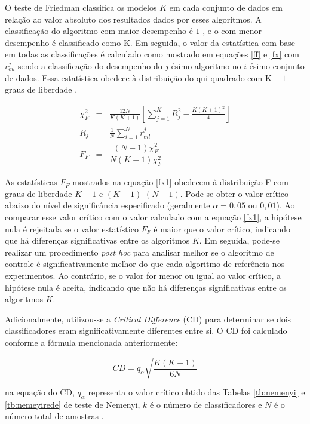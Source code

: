 O teste de Friedman classifica os modelos $K$ em cada conjunto de dados em relação ao valor absoluto dos resultados dados por esses algoritmos. A classificação do algoritmo com maior desempenho é $1$ , e o com menor desempenho é classificado como $\mathrm{K}$. Em seguida, o valor da estatística com base em todas as classificações é calculado como mostrado em equações \eqref{ff} e \eqref{fx} com $r_{e u}^j$ sendo a classificação do desempenho do $j$-ésimo algoritmo no $i$-ésimo conjunto de dados. Essa estatística obedece à distribuição do qui-quadrado com $\mathrm{K}-1$ graus de liberdade \cite{Liu2022}.
 
 \begin{eqnarray}
 	\chi_F^2 & =&\frac{12 N}{K(K+1)}\left[\sum_{j=1}^K R_j^2-\frac{K(K+1)^2}{4}\right] \label{ff}\\
 	R_j & =&\frac{1}{N} \sum_{i=1}^N r_{e i l}^j \label{fx}\\
 	F_F&=&\dfrac{(N-1) \chi_F^2}{N(K-1) \chi_F^2}\label{fx1}
 \end{eqnarray}
 
 
As estatísticas $F_F$ mostrados na equação \eqref{fx1} obedecem à distribuição F com graus de liberdade $K-1$ e $(K-1)$ $(N-1)$. Pode-se obter o valor crítico abaixo do nível de significância especificado (geralmente $\alpha = 0,05$ ou $0,01$). Ao comparar esse valor crítico com o valor calculado com a equação \eqref{fx1}, a hipótese nula é rejeitada se o valor estatístico $F_F$ é maior que o valor crítico, indicando que há diferenças significativas entre os algoritmos $K$. Em seguida, pode-se realizar um procedimento \textit{post hoc} para analisar melhor se o algoritmo de controle é significativamente melhor do que cada algoritmo de referência nos experimentos. Ao contrário, se o valor for menor ou igual ao valor crítico, a hipótese nula é aceita, indicando que não há diferenças significativas entre os algoritmos $K$.
  
Adicionalmente, utilizou-se a \textit{Critical Difference} (CD) para determinar se dois classificadores eram significativamente diferentes entre si. O CD foi calculado conforme a fórmula mencionada anteriormente:
 
 \begin{equation}
 	CD = q_\alpha \sqrt{\frac{K(K+1)}{6N}}
 \end{equation}
 
\noindent na equação do CD, $q_\alpha$ representa o valor crítico obtido das Tabelas \ref{tb:nemenyi} e \ref{tb:nemeyirede} de teste de Nemenyi, $k$ é o número de classificadores e $N$ é o número total de amostras \cite{Liu2022}.
 
 
 



